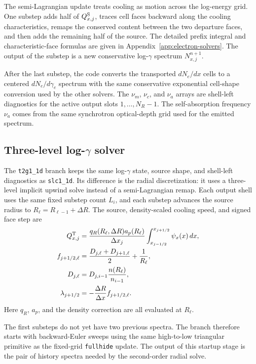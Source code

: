 \documentclass[twocolumn]{aastex702}
\begin{document}
The semi-Lagrangian update treats cooling as motion across the log-energy grid.
One substep adds half of \(Q_{x,j}^{\rm S}\), traces cell faces backward along the
cooling characteristics, remaps the conserved content between the two departure
faces, and then adds the remaining half of the source.  The detailed prefix
integral and characteristic-face formulas are given in
Appendix~\ref{app:electron-solvers}.  The output of the substep is a new
conservative log-\(\gamma\) spectrum \(N_{x,j}^{n+1}\).

After the last substep, the code converts the transported \(dN_e/dx\) cells to a
centered \(dN_e/d\gamma_e\) spectrum with the same conservative exponential
cell-shape conversion used by the other solvers.  The \(\nu_m\), \(\nu_c\), and
\(\nu_a\) arrays are shell-left diagnostics for the active output slots
\(1,\ldots,N_R-1\).  The self-absorption frequency \(\nu_a\) comes from the same
synchrotron optical-depth grid used for the emitted spectrum.

\subsection{Three-level log-\texorpdfstring{\(\gamma\)}{gamma} solver}

The \texttt{t2g1\_1d} branch keeps the same log-\(\gamma\) state, source shape,
and shell-left diagnostics as \texttt{slc1\_1d}.  Its difference is the radial
discretization: it uses a three-level implicit upwind solve instead of a
semi-Lagrangian remap.  Each output shell uses the same fixed substep count
\(L_i\), and each substep advances the source radius to
\(R_\ell=R_{\ell-1}+\Delta R\).  The source, density-scaled cooling speed, and
signed face step are
\begin{equation}
\begin{aligned}
Q_{x,j}^{\rm T}&=
\frac{q_R(R_\ell,\Delta R)a_p(R_\ell)}{\Delta x_j}
\int_{x_{j-1/2}}^{x_{j+1/2}}
\psi_x(x)\,dx,\\
f_{j+1/2,\ell}&=
\frac{D_{j,\ell}+D_{j+1,\ell}}{2}+\frac{1}{R_\ell},\\
D_{j,\ell}&=D_{j,i-1}\frac{n(R_\ell)}{n_{i-1}},\\
\lambda_{j+1/2}&=-\frac{\Delta R}{\Delta x}f_{j+1/2,\ell}.
\end{aligned}
\end{equation}
Here \(q_R\), \(a_p\), and the density correction are all evaluated at
\(R_\ell\).

The first substeps do not yet have two previous spectra.  The branch therefore
starts with backward-Euler sweeps using the same high-to-low triangular primitive
as the fixed-grid \texttt{fullhide} update.  The output of this startup stage is
the pair of history spectra needed by the second-order radial solve.
\end{document}
